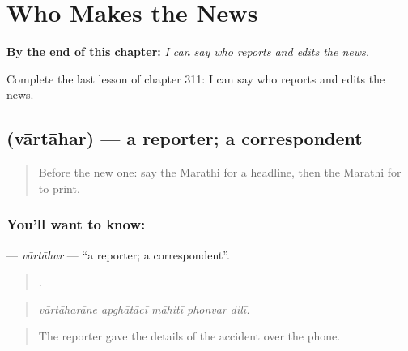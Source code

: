 
\chapter{Who Makes the News}
\label{ch:mr-who-makes-the-news}

\begin{chapteropening}
\textbf{By the end of this chapter:} \emph{I can say who reports and edits the news.}

Complete the last lesson of chapter 311: I can say who reports and edits the news.
\end{chapteropening}

\section[\texorpdfstring{\mr{वार्ताहर} (vārtāhar)}{वार्ताहर (vārtāhar)}]{ (vārtāhar) — a reporter; a correspondent}

\label{lesson:MR-C311-vartahar}



\begin{quote}
Before the new one: say the Marathi for a headline, then the Marathi for to print.
\end{quote}

\subsection*{You'll want to know: }
\textbf{} — \emph{vārtāhar} — \textquotedblleft{}a reporter; a correspondent\textquotedblright{}.

\begin{quote}
    .
\end{quote}

\begin{quote}
\emph{vārtāharāne apghātācī māhitī phonvar dilī.}
\end{quote}

\begin{quote}
The reporter gave the details of the accident over the phone.
\end{quote}

